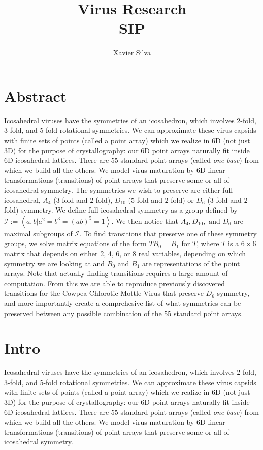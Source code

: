 \documentclass[a4paper,10pt]{article}
\title{Virus Research \\ \large SIP}
\author{Xavier Silva}
\theoremstyle{plain}
\theoremstyle{definition}
\theoremstyle{remark}
\newcommand{\generatedby}[1]{\left\langle#1\right\rangle}
\begin{document}
\maketitle

\tableofcontents


\section{Abstract}

Icosahedral viruses have the symmetries of an icosahedron, which involves 2-fold, 3-fold, and 5-fold rotational symmetries.
We can approximate these virus capsids with finite sets of points (called a point array) which we realize in 6D (not just 3D) for the purpose of crystallography: our 6D point arrays naturally fit inside 6D icosahedral lattices. There are \(55\) standard point arrays (called \emph{one-base}) from which we build all the others.
We model virus maturation by 6D linear transformations (transitions) of point arrays that preserve some or all of icosahedral symmetry.
The symmetries we wish to preserve are either full icosahedral, $A_4$ ($3$-fold and $2$-fold), $D_{10}$ ($5$-fold and $2$-fold) or $D_6$ ($3$-fold and $2$-fold) symmetry.
We define full icosahedral symmetry as a group defined by \(\mathcal{I} := \generatedby{a, b | a^2 = b^3 = (ab)^5 = 1}\).
We then notice that \(A_4, D_{10}, \text{ and } D_6\) are maximal subgroups of \(\mathcal{I}\).
To find transitions that preserve one of these symmetry groups, we solve matrix equations of the form \(TB_0 = B_1\) for \(T\), where \(T\) is a \(6\times6\) matrix that depends on either 2, 4, 6, or 8 real variables, depending on which symmetry we are looking at and \(B_0\) and \(B_1\) are representations of the point arrays.
Note that actually finding transitions requires a large amount of computation.
From this we are able to reproduce previously discovered transitions for the Cowpea Chlorotic Mottle Virus that preserve \(D_6\) symmetry, and more importantly create a comprehesive list of what symmetries can be preserved between any possible combination of the \(55\) standard point arrays.

\section{Intro}
Icosahedral viruses have the symmetries of an icosahedron, which involves 2-fold, 3-fold, and 5-fold rotational symmetries.
We can approximate these virus capsids with finite sets of points (called a point array) which we realize in 6D (not just 3D) for the purpose of crystallography: our 6D point arrays naturally fit inside 6D icosahedral lattices. 
There are \(55\) standard point arrays (called \emph{one-base}) from which we build all the others.
We model virus maturation by 6D linear transformations (transitions) of point arrays that preserve some or all of icosahedral symmetry.
\end{document}

